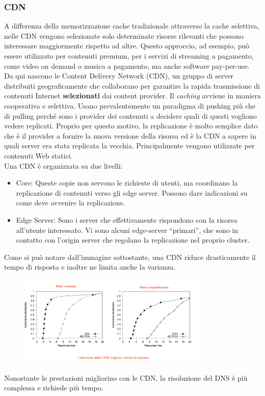 \documentclass{article}
\begin{document}
		\subsubsection{CDN}
		A differenza della memorizzazione cache tradizionale attraverso la cache selettiva, nelle CDN vengono selezionate solo determinate risorse rilevanti che possono interessare maggiormente rispetto ad altre.
		Questo approccio, ad esempio, può essere utilizzato per contenuti premium, per i servizi di streaming a pagamento, come video on demand o musica a pagamento, ma anche software pay-per-use.\\
		
		Da qui nascono le Content Delivery Network (CDN), un gruppo di server distribuiti geograficamente che collaborano per garantire la rapida trasmissione di contenuti Internet \textbf{selezionati} dai content provider.
		Il \textit{caching} avviene in maniera cooperativa e selettiva. Usano prevalentemente un paradigma di pushing più che di pulling perché sono i provider dei contenuti a decidere quali di questi vogliono vedere replicati. Proprio per questo motivo, la replicazione è molto semplice dato che è il provider a fornire la nuova versione della risorsa ed è la CDN a sapere in quali server era stata replicata la vecchia.
		Principalmente vengono utilizzate per contenuti Web statici.\\
		
		Una CDN è organizzata su due livelli:
		\begin{itemize}
			\item Core: Queste copie non servono le richieste di utenti, ma coordinano la replicazione di contenuti verso gli edge server. Possono dare indicazioni su come deve avvenire la replicazione.
			\item Edge Server: Sono i server che effettivamente rispondono con la risorsa all’utente interessato. Vi sono alcuni edge-server “primari”, che sono in contatto con l’origin server che regolano la	replicazione nel proprio cluster.
		\end{itemize}
		
		Come si può notare dall'immagine sottostante, una CDN riduce drasticamente il tempo di risposta e inoltre ne limita anche la varianza.
		\begin{figure}[ht]
		    \centering
		    \includegraphics[width=0.8\textwidth]{SAC_A4_cdn.png}
		\end{figure}
		Nonostante le prestazioni migliorino con le CDN, la risoluzione del DNS è più complessa e richiede più tempo.
		\newpage
		
\end{document}
